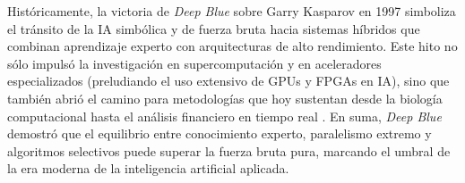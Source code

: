\documentclass[a4paper, 12pt]{article}
\begin{document}
Históricamente, la victoria de \textit{Deep Blue} sobre Garry 
Kasparov en 1997 simboliza el tránsito de la IA simbólica y de 
fuerza bruta hacia sistemas híbridos que combinan aprendizaje 
experto con arquitecturas de alto rendimiento. 
Este hito no sólo impulsó la investigación en supercomputación y 
en aceleradores especializados (preludiando el uso extensivo de 
GPUs y FPGAs en IA), sino que también abrió el camino para metodologías 
que hoy sustentan desde la biología computacional hasta el 
análisis financiero en tiempo real \cite{wired2017ai}. 
En suma, \textit{Deep Blue} demostró que el equilibrio entre 
conocimiento experto, paralelismo extremo y algoritmos 
selectivos puede superar la fuerza bruta pura, marcando el 
umbral de la era moderna de la inteligencia artificial aplicada.



\newpage

\end{document}
